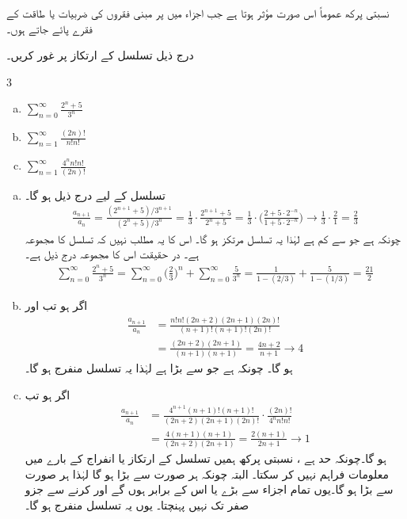 
نسبتی  پرکھ عموماً اس صورت مؤثر ہوتا ہے جب اجزاء میں  پر مبنی فقروں کی  ضربیات  یا  طاقت کے فقرے پائے جاتے ہوں۔

درج ذیل تسلسل کے  ارتکاز پر غور کریں۔
\begin{multicols}{3}
\begin{enumerate}[a.]
\item
$\sum\limits_{n=0}^{\infty}\frac{2^n+5}{3^n}$
\item
$\sum\limits_{n=1}^{\infty}\frac{(2n)!}{n!n!}$
\item
$\sum_{n=1}^{\infty}\frac{4^nn!n!}{(2n)!}$
\end{enumerate}
\end{multicols}
\begin{enumerate}[a.]
\item
تسلسل  کے لیے درج ذیل ہو گا۔
\begin{align*}
\frac{a_{n+1}}{a_n}=\frac{(2^{n+1}+5)/3^{n+1}}{(2^n+5)/3^n}=\frac{1}{3}\cdot\frac{2^{n+1}+5}{2^n+5}=\frac{1}{3}\cdot\big(\frac{2+5\cdot 2^{-n}}{1+5\cdot2^{-n}}\big)\to\frac{1}{3}\cdot\frac{2}{1}=\frac{2}{3}
\end{align*}
چونکہ  ہے جو  سے کم ہے لہٰذا یہ تسلسل مرتکز ہو گا۔ اس کا یہ مطلب نہیں کہ تسلسل کا مجموعہ  ہے۔ در حقیقت اس کا مجموعہ درج ذیل ہے۔
\begin{align*}
\sum_{n=0}^{\infty}\frac{2^n+5}{3^n}=\sum_{n=0}^{\infty}\big(\frac{2}{3}\big)^n+\sum_{n=0}^{\infty}\frac{5}{3^n}=\frac{1}{1-(2/3)}+\frac{5}{1-(1/3)}=\frac{21}{2}
\end{align*}
\item
اگر  ہو تب  اور
\begin{align*}
\frac{a_{n+1}}{a_n}&=\frac{n!n!(2n+2)(2n+1)(2n)!}{(n+1)!(n+1)!(2n)!}\\
&=\frac{(2n+2)(2n+1)}{(n+1)(n+1)}=\frac{4n+2}{n+1}\to 4
\end{align*}
ہو گا۔ چونکہ   ہے  جو  سے بڑا ہے لہٰذا یہ تسلسل منفرج ہو گا۔
\item
اگر  ہو تب
\begin{align*}
\frac{a_{n+1}}{a_n}&=\frac{4^{n+1}(n+1)!(n+1)!}{(2n+2)(2n+1)(2n)!}\cdot\frac{(2n)!}{4^nn!n!}\\
&=\frac{4(n+1)(n+1)}{(2n+2)(2n+1)}=\frac{2(n+1)}{2n+1}\to 1
\end{align*}
ہو گا۔چونکہ حد  ہے ، نسبتی  پرکھ ہمیں تسلسل کے  ارتکاز یا انفراج کے بارے میں معلومات فراہم نہیں کر سکتا۔ البتہ چونکہ  
  ہر صورت  سے بڑا ہو گا لہٰذا  ہر صورت  سے بڑا ہو گا۔یوں تمام اجزاء  سے بڑے یا اس کے برابر ہوں گے اور  کرنے سے  جزو صفر تک نہیں پہنچتا۔ یوں یہ تسلسل منفرج ہو گا۔
\end{enumerate}

